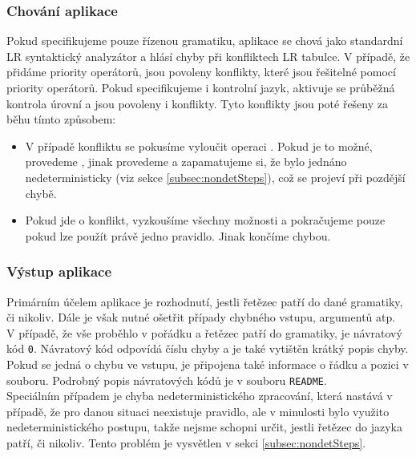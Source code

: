 \subsubsection*{Chování aplikace}

Pokud specifikujeme pouze řízenou gramatiku, aplikace se chová jako
standardní LR syntaktický analyzátor a hlásí chyby při konfliktech LR tabulce.
V případě, že přidáme priority operátorů, jsou povoleny 
konflikty, které jsou řešitelné pomocí priority operátorů.
Pokud specifikujeme i kontrolní jazyk, aktivuje se
průběžná kontrola úrovní a jsou povoleny  i
 konflikty. Tyto konflikty jsou poté
řešeny za běhu tímto způsobem:

\begin{itemize}
  \item V případě  konfliktu se pokusíme vyloučit operaci
    . Pokud je to možné, provedeme , jinak
    provedeme  a zapamatujeme si, že bylo jednáno
    nedeterministicky (viz sekce \ref{subsec:nondetSteps}), což se projeví při pozdější chybě.
  \item Pokud jde o  konflikt, vyzkoušíme všechny možnosti a
    pokračujeme pouze pokud lze použít právě jedno pravidlo. Jinak končíme
    chybou.
\end{itemize}

\subsubsection*{Výstup aplikace}

Primárním účelem aplikace je rozhodnutí, jestli řetězec patří do dané
gramatiky, či nikoliv. Dále je však nutné ošetřit případy chybného vstupu,
argumentů atp.\\

V případě, že vše proběhlo v pořádku a řetězec patří do gramatiky, je návratový
kód \texttt{0}. Návratový kód odpovídá číslu chyby a je také vytištěn krátký
popis chyby. Pokud se jedná o chybu ve vstupu, je připojena také informace o
řádku a pozici v souboru. Podrobný popis návratových kódů je v souboru \texttt{README}.\\

Speciálním případem je chyba nedeterministického zpracování, která nastává
v případě, že pro danou situaci neexistuje pravidlo, ale v minulosti
bylo využito nedeterministického postupu, takže nejsme schopni určit, jestli
řetězec do jazyka patří, či nikoliv. Tento problém je vysvětlen v sekci
\ref{subsec:nondetSteps}.

